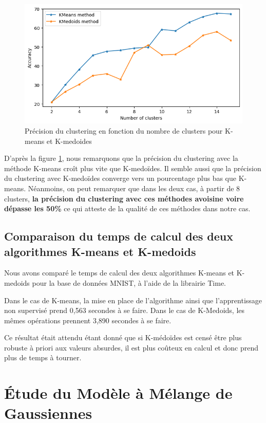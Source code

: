 \documentclass[french,a4paper,18pt]{article}
\begin{document}
\begin{figure}[h!]
    \centering
    \includegraphics[scale=0.4]{images/mnist_comparison_accuracy.png}
    \caption{Précision du clustering en fonction du nombre de clusters pour K-means et K-medoides}\label{fig:mnist_comparison_accuracy}
\end{figure}

D'après la figure \ref{fig:mnist_comparison_accuracy}, nous remarquons que la précision du clustering avec la méthode K-means croît plus vite que K-medoïdes. Il semble aussi que la précision du clustering avec K-medoïdes converge vers un pourcentage plus bas que K-means. Néanmoins, on peut remarquer que dans les deux cas, à partir de 8 clusters, \textbf{la précision du clustering avec ces méthodes avoisine voire dépasse les 50\%} ce qui atteste de la qualité de ces méthodes dans notre cas.

\subsection{Comparaison du temps de calcul des deux algorithmes K-means et K-medoids}

Nous avons comparé le temps de calcul des deux algorithmes K-means et K-medoids pour la base de données MNIST, à l'aide de la librairie Time.

Dans le cas de K-means, la mise en place de l'algorithme ainsi que l'apprentissage non supervisé prend 0,563 secondes à se faire. Dans le cas de K-Medoids, les mêmes opérations prennent 3,890 secondes à se faire.

Ce résultat était attendu étant donné que si K-médoïdes est censé être plus robuste à priori aux valeurs absurdes, il est plus coûteux en calcul et donc prend plus de temps à tourner.


\section{Étude du Modèle à Mélange de Gaussiennes}
\end{document}

